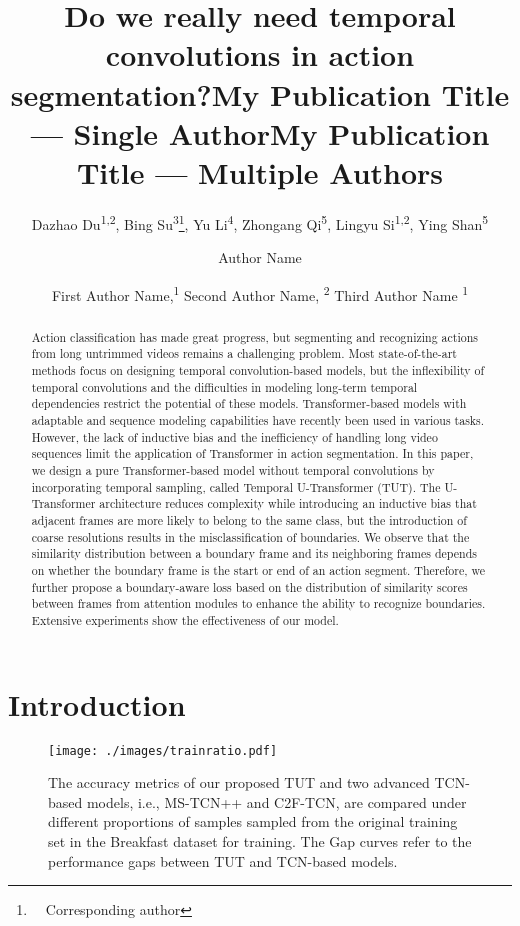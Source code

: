 \documentclass[letterpaper]{article} \usepackage[submission]{aaai23}  \usepackage{times}  \usepackage{helvet}  \usepackage{courier}  \usepackage[hyphens]{url}  \usepackage{graphicx} \urlstyle{rm} \def\UrlFont{\rm}  \usepackage{natbib}  \usepackage{caption} \frenchspacing  \setlength{\pdfpagewidth}{8.5in} \setlength{\pdfpageheight}{11in} \usepackage{algorithm}
\title{Do we really need temporal convolutions in action segmentation?}
\author{
    Dazhao Du\textsuperscript{\rm{1,2}},
    Bing Su\textsuperscript{\rm3}\thanks{\ \ Corresponding author},
    Yu Li\textsuperscript{\rm4},
    Zhongang Qi\textsuperscript{\rm5},
    Lingyu Si\textsuperscript{\rm{1,2}},
    Ying Shan\textsuperscript{\rm{5}}
}
\title{My Publication Title --- Single Author}
\author {
    Author Name
}
\title{My Publication Title --- Multiple Authors}
\author {
First Author Name,\textsuperscript{\rm 1}
    Second Author Name, \textsuperscript{\rm 2}
    Third Author Name \textsuperscript{\rm 1}
}
\begin{document}
\maketitle

\begin{abstract}
Action classification has made great progress, but segmenting and recognizing actions from long untrimmed videos remains a challenging problem. Most state-of-the-art methods focus on designing temporal convolution-based models, but the inflexibility of temporal convolutions and the difficulties in modeling long-term temporal dependencies restrict the potential of these models. Transformer-based models with adaptable and sequence modeling capabilities have recently been used in various tasks. However, the lack of inductive bias and the inefficiency of handling long video sequences limit the application of Transformer in action segmentation. In this paper, we design a pure Transformer-based model without temporal convolutions by incorporating temporal sampling, called Temporal U-Transformer (TUT). The U-Transformer architecture reduces complexity while introducing an inductive bias that adjacent frames are more likely to belong to the same class, but the introduction of coarse resolutions results in the misclassification of boundaries. We observe that the similarity distribution between a boundary frame and its neighboring frames depends on whether the boundary frame is the start or end of an action segment. Therefore, we further propose a boundary-aware loss based on the distribution of similarity scores between frames from attention modules to enhance the ability to recognize boundaries. Extensive experiments show the effectiveness of our model.
\end{abstract}

\section{Introduction}
\label{sec:intro}

\begin{figure}[t]
\centering
\texttt{[image: ./images/trainratio.pdf]} \caption{The accuracy metrics of our proposed TUT and two advanced TCN-based models, i.e., MS-TCN++ and C2F-TCN, are compared under different proportions of samples sampled from the original training set in the Breakfast dataset for training. The Gap curves refer to the performance gaps between TUT and TCN-based models.}
\label{fig:trainratio}
\end{figure}
\end{document}
